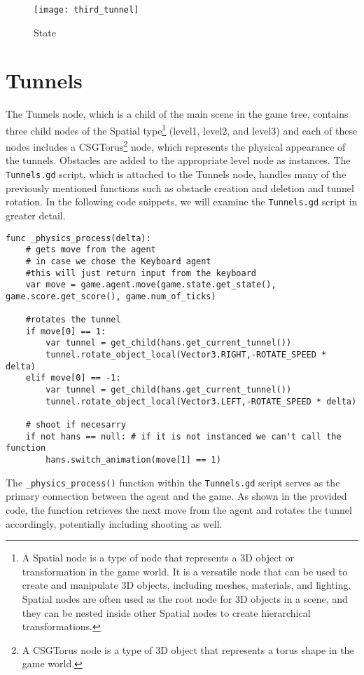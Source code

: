 \begin{figure}[h]
    \centering
    \texttt{[image: third\_tunnel]}
    \caption{State}
    \label{fig:third_tunnel}
\end{figure}

\section{Tunnels}
\label{tunnel_script}
The Tunnels node, which is a child of the main scene in the game tree, contains three child nodes of the Spatial type\footnote{A Spatial node is a type of node that represents a 3D object or transformation in the game world. It is a versatile node that can be used to create and manipulate 3D objects, including meshes, materials, and lighting. Spatial nodes are often used as the root node for 3D objects in a scene, and they can be nested inside other Spatial nodes to create hierarchical transformations.} (level1, level2, and level3) and each of these nodes includes a CSGTorus\footnote{ A CSGTorus node is a type of 3D object that represents a torus shape in the game world.} node, which represents the physical appearance of the tunnels. Obstacles are added to the appropriate level node as instances. The \texttt{Tunnels.gd} script, which is attached to the Tunnels node, handles many of the previously mentioned functions such as obstacle creation and deletion and tunnel rotation. In the following code snippets, we will examine the \texttt{Tunnels.gd} script in greater detail.

\begin{lstlisting}
func _physics_process(delta):   
	# gets move from the agent
	# in case we chose the Keyboard agent 
	#this will just return input from the keyboard
    var move = game.agent.move(game.state.get_state(), game.score.get_score(), game.num_of_ticks)
    
    #rotates the tunnel
    if move[0] == 1:
        var tunnel = get_child(hans.get_current_tunnel())
        tunnel.rotate_object_local(Vector3.RIGHT,-ROTATE_SPEED * delta)
    elif move[0] == -1:
        var tunnel = get_child(hans.get_current_tunnel())
        tunnel.rotate_object_local(Vector3.LEFT,-ROTATE_SPEED * delta)
        
    # shoot if necesarry
    if not hans == null: # if it is not instanced we can't call the function       
        hans.switch_animation(move[1] == 1)
\end{lstlisting}

The \texttt{\_physics\_process()} function within the \texttt{Tunnels.gd} script serves as the primary connection between the agent and the game. As shown in the provided code, the function retrieves the next move from the agent and rotates the tunnel accordingly, potentially including shooting as well.

